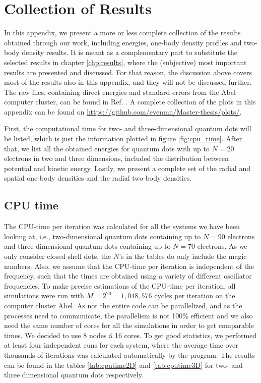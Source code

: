 \chapter{Collection of Results} \label{chp:totalresults}
In this appendix, we present a more or less complete collection of the results obtained through our work, including energies, one-body density profiles and two-body density results. It is meant as a complementary part to substitute the selected results in chapter \ref{chp:results}, where the (subjective) most important results are presented and discussed. For that reason, the discussion above covers most of the results also in this appendix, and they will not be discussed further. The raw files, containing direct energies and standard errors from the Abel computer cluster, can be found in Ref. \cite{nordhagen_even_marius_2019_3477946}. A complete collection of the plots in this appendix can be found on \url{https://github.com/evenmn/Master-thesis/plots/}. 

First, the computational time for two- and three-dimensional quantum dots will be listed, which is just the information plotted in figure \eqref{fig:cpu_time}. After that, we list all the obtained energies for quantum dots with up to $N=20$ electrons in two and three dimensions, included the distribution between potential and kinetic energy. Lastly, we present a complete set of the radial and spatial one-body densities and the radial two-body densities. 

\section{CPU time} \label{sec:cputime}
The CPU-time per iteration was calculated for all the systems we have been looking at, i.e., two-dimensional quantum dots containing up to $N=90$ electrons and three-dimensional quantum dots containing up to $N=70$ electrons. As we only consider closed-shell dots, the $N$'s in the tables do only include the magic numbers. Also, we assume that the CPU-time per iteration is independent of the frequency, such that the times are obtained using a variety of different oscillator frequencies. To make precise estimations of the CPU-time per iteration, all simulations were run with $M=2^{20}=1,048,576$ cycles per iteration on the computer cluster Abel. As not the entire code can be parallelized, and as the processes need to communicate, the parallelism is not 100\% efficient and we also need the same number of cores for all the simulations in order to get comparable times. We decided to use 8 nodes á 16 cores. To get good statistics, we performed at least four independent runs for each system, where the average time over thousands of iterations was calculated automatically by the program. The results can be found in the tables \eqref{tab:cputime2D} and \eqref{tab:cputime3D} for two- and three dimensional quantum dots respectively. 

